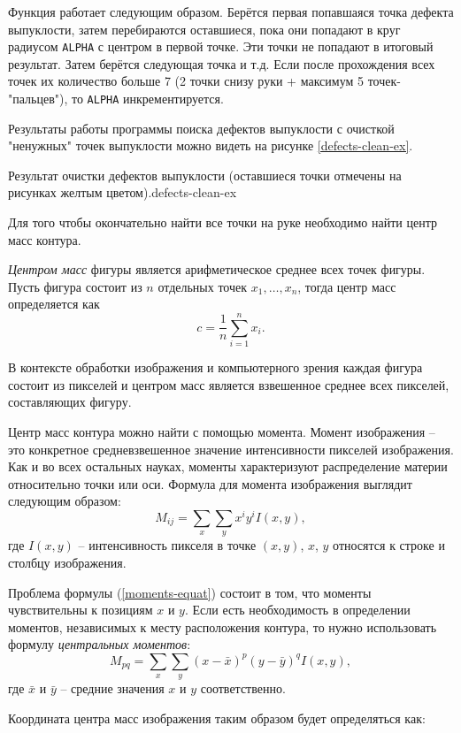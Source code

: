 Функция работает следующим образом. Берётся первая попавшаяся точка
дефекта выпуклости, затем перебираются оставшиеся, пока они попадают
в круг радиусом {\tt ALPHA} с центром в первой точке. Эти точки не
попадают в итоговый результат. Затем берётся следующая точка и т.д.
Если после прохождения всех точек их количество больше 7 (2 точки
снизу руки + максимум 5 точек-"пальцев"), то {\tt ALPHA}
инкрементируется.

Результаты работы программы поиска дефектов выпуклости с 
очисткой "ненужных" точек выпуклости можно видеть на рисунке
\ref{defects-clean-ex}.

{Результат очистки дефектов выпуклости (оставшиеся точки 
отмечены на рисунках желтым цветом).}{defects-clean-ex}

Для того чтобы окончательно найти все точки на руке необходимо найти
центр масс контура. 

{\it Центром масс} фигуры является арифметическое среднее всех точек
фигуры. Пусть фигура состоит из $n$ отдельных точек 
$x_1, \ldots, x_n$, тогда центр масс определяется как
$$ c = \frac{1}{n}\sum_{i=1}^n{x_i}. $$

В контексте обработки изображения и компьютерного зрения каждая фигура
состоит из пикселей и центром масс является взвешенное среднее всех
пикселей, составляющих фигуру.

Центр масс контура можно найти с помощью {момента}. Момент изображения
-- это конкретное средневзвешенное значение интенсивности пикселей
изображения. Как и во всех остальных науках, моменты характеризуют
распределение материи относительно точки или оси. Формула для
момента изображения выглядит следующим образом:
\begin{equation}
M_{ij} = \sum_x{\sum_y{x^iy^iI(x,y)}}, 
\label{moments-equat}
\end{equation}
где $I(x,y)$ -- интенсивность пикселя в точке $(x,y)$,
$x$, $y$ относятся к строке и столбцу изображения. 

Проблема формулы (\ref{moments-equat}) состоит в том, что
моменты чувствительны к позициям $x$ и $y$. Если есть необходимость
в определении моментов, независимых к месту расположения контура, то
нужно использовать формулу {\it центральных моментов}:
$$M_{pq} = \sum_x{\sum_y{(x-\bar x)^p(y-\bar y)^qI(x,y)}}, $$
где $\bar x$ и $\bar y$ -- средние значения $x$ и $y$ соответственно.

Координата центра масс изображения таким образом будет определяться
как:

